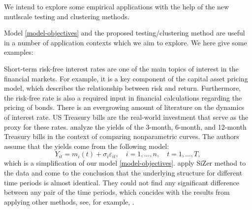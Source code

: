 \documentclass[a4paper,12pt]{article}
\begin{document}
\begin{itemize}[label=--,leftmargin=0.5cm]
We intend to explore some empirical applications with the help of the new mutlscale testing and clustering methods. 

Model \eqref{model-objectives} and the proposed testing/clustering method are useful in a number of application contexts which we aim to explore. We here give some examples: 

\begin{example}
Short-term risk-free interest rates are one of the main topics of interest in the financial markets. For example, it is a key component of the capital asset pricing model, which describes the relationship between risk and return. Furthermore, the risk-free rate is also a required input in financial calculations regarding the pricing of bonds. There is an evergrowing amount of literature on the dynamics of interest rate. US Treasury bills are the real-world investment that serve as the proxy for these rates. \cite{Park2009} analyze the yields of the 3-month, 6-month, and 12-month Treasury bills in the context of comparing nonparametric curves. The authors assume that the yields come from the following model:
\begin{equation}\label{model-park}
Y_{it} = m_i(t) + \sigma_i \varepsilon_{it}, \quad i=1,\ldots, n, \quad t=1,\ldots,T,
\end{equation}
which is a simplification of our model \eqref{model-objectives}. \cite{Park2009} apply Si{Z}er method to the data and come to the conclusion that the underlying structure for different time periods is almost identical. They could not find any significant difference between any pair of the time periods, which concides with the results from applying other methods, see, for example, \cite{Fan2008}.
\end{example}


\end{itemize}
\end{document}
